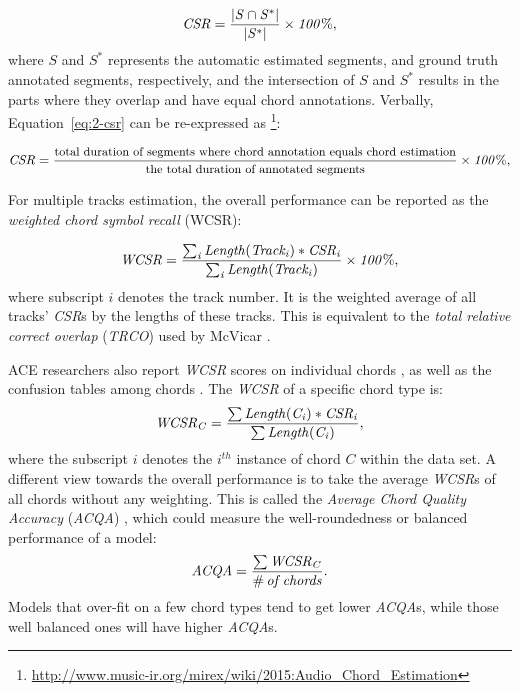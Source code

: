 \begin{equation}
\mathit{CSR = {|S\cap S^*|\over|S^*|} \times 100\%,}
\label{eq:2-csr}
\end{equation}
where $S$ and $S^*$ represents the automatic estimated segments, and ground truth annotated segments, respectively, and the intersection of $S$ and $S^*$ results in the parts where they overlap and have equal chord annotations. Verbally, Equation~\ref{eq:2-csr} can be re-expressed as \footnote{\url{http://www.music-ir.org/mirex/wiki/2015:Audio\_Chord\_Estimation}}:

\begin{equation}\footnotesize
\mathit{CSR = {\text{total duration of segments where chord annotation equals chord estimation}\over\text{the total duration of annotated segments}} \times 100\%,}
\label{eq:2-csrv}
\end{equation}

For multiple tracks estimation, the overall performance can be reported as the {\it weighted chord symbol recall} (WCSR):

\begin{equation}
\mathit{WCSR = {\sum_i{Length(Track_i)*CSR_i} \over \sum_i{Length(Track_i)}}\times 100\%,}
\label{eq:2-wcsr}
\end{equation}
where subscript $i$ denotes the track number. It is the weighted average of all tracks' \textit{CSR}s by the lengths of these tracks. This is equivalent to the {\it total relative correct overlap} (\textit{TRCO}) used by McVicar \cite{mcvicar2013machine}.

ACE researchers also report \textit{WCSR} scores on individual chords \cite{mauch2010automatic,deng2016chord}, as well as the confusion tables among chords \cite{mauch2010automatic,oudre2010template,papadopoulos2010joint,khadkevich2011music,deng2016hybrid}. The \textit{WCSR} of a specific chord type is:
\begin{equation}
\mathit{WCSR_{C} = {\sum{Length(C_i)*CSR_i} \over \sum{Length(C_i)}}},
\label{eq:wcsrchord}
\end{equation}
where the subscript $i$ denotes the $i^{th}$ instance of chord $C$ within the data set. A different view towards the overall performance is to take the average \textit{WCSR}s of all chords without any weighting. This is called the \textit{Average Chord Quality Accuracy} (\textit{ACQA}) \cite{cho2014improved}, which could measure the well-roundedness or balanced performance of a model:
\begin{equation}
\mathit{ACQA = {{\sum{WCSR_{C}}} \over {\#\,of\,chords}}}.
\label{eq:2-acqa}
\end{equation}
Models that over-fit on a few chord types tend to get lower \textit{ACQA}s, while those well balanced ones will have higher \textit{ACQA}s.

